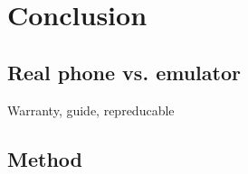 \section{Conclusion}
\subsection{Real phone vs. emulator}
Warranty, guide, repreducable


\subsection{Method}
